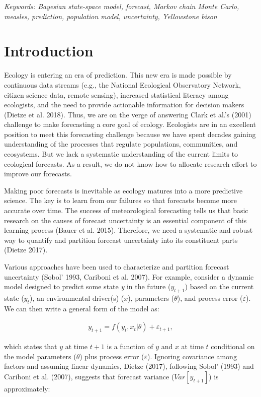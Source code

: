 \documentclass[12pt,]{article}
\begin{document}
\emph{Keywords: Bayesian state-space model, forecast, Markov chain Monte
Carlo, measles, prediction, population model, uncertainty, Yellowstone
bison}

\section{Introduction}\label{introduction}

Ecology is entering an era of prediction. This new era is made possible
by continuous data streams (e.g., the National Ecological Observatory
Network, citizen science data, remote sensing), increased statistical
literacy among ecologists, and the need to provide actionable
information for decision makers (Dietze et al. 2018). Thus, we are on
the verge of answering Clark et al.'s (2001) challenge to make
forecasting a core goal of ecology. Ecologists are in an excellent
position to meet this forecasting challenge because we have spent
decades gaining understanding of the processes that regulate
populations, communities, and ecosystems. But we lack a systematic
understanding of the current limits to ecological forecasts. As a
result, we do not know how to allocate research effort to improve our
forecasts.

Making poor forecasts is inevitable as ecology matures into a more
predictive science. The key is to learn from our failures so that
forecasts become more accurate over time. The success of meteorological
forecasting tells us that basic research on the causes of forecast
uncertainty is an essential component of this learning process (Bauer et
al. 2015). Therefore, we need a systematic and robust way to quantify
and partition forecast uncertainty into its constituent parts (Dietze
2017).

Various approaches have been used to characterize and partition forecast
uncertainty (Sobol' 1993, Cariboni et al. 2007). For example, consider a
dynamic model designed to predict some state \emph{y} in the future
(\(y_{t+1}\)) based on the current state (\(y_{t}\)), an environmental
driver(s) (\(x\)), parameters (\(\theta\)), and process error
(\(\varepsilon\)). We can then write a general form of the model as:

\begin{align}
y_{t+1} = f(y_t, x_t|\theta) + \varepsilon_{t+1},
\end{align}

\noindent{}which states that \(y\) at time \(t+1\) is a function of
\(y\) and \(x\) at time \(t\) conditional on the model parameters
(\(\theta\)) plus process error (\(\varepsilon\)). Ignoring covariance
among factors and assuming linear dynamics, Dietze (2017), following
Sobol' (1993) and Cariboni et al. (2007), suggests that forecast
variance (\(Var[y_{t+1}]\)) is approximately:
\end{document}
